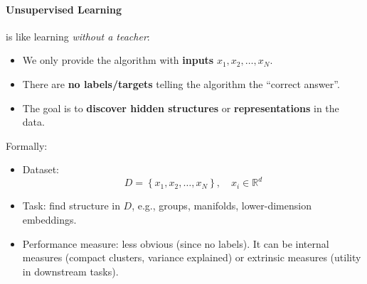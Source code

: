 \paragraph{Unsupervised Learning}

 is like learning \emph{without a teacher}:
\begin{itemize}
    \item We only provide the algorithm with \textbf{inputs} $x_{1}, x_{2}, \dots, x_{N}$.
    \item There are \textbf{no labels/targets} telling the algorithm the ``correct answer''.
    \item The goal is to \textbf{discover hidden structures} or \textbf{representations} in the data.
\end{itemize}
Formally:
\begin{itemize}
    \item Dataset:
    \begin{equation*}
        D = \left\{x_{1}, x_{2}, \dots, x_{N}\right\}, \quad x_{i} \in \mathbb{R}^{d}
    \end{equation*}
    \item Task: find structure in $D$, e.g., groups, manifolds, lower-dimension embeddings.
    \item Performance measure: less obvious (since no labels). It can be internal measures (compact clusters, variance explained) or extrinsic measures (utility in downstream tasks).
\end{itemize}

